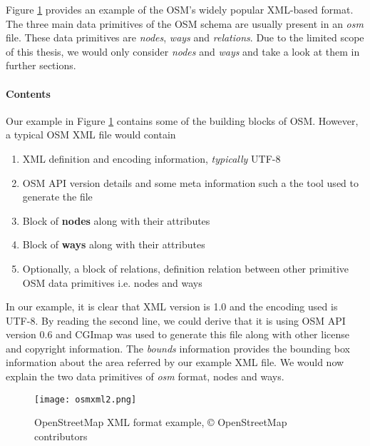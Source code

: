 Figure \ref{fg:osmxml} provides an example of the OSM's widely popular XML-based format. The three main data primitives of the OSM schema are usually present in an \textit{osm} file. These data primitives are \textit{nodes}, \textit{ways} and \textit{relations}. Due to the limited scope of this thesis, we would only consider \textit{nodes} and \textit{ways} and take a look at them in further sections.

\paragraph{Contents}
Our example in Figure \ref{fg:osmxml} contains some of the building blocks of OSM. However, a typical OSM XML file would contain
\begin{enumerate}
\item{XML definition and encoding information, \textit{typically} UTF-8}
\item{OSM API version details and some meta information such a the tool used to generate the file}
\item{Block of \textbf{nodes} along with their attributes}
\item{Block of \textbf{ways} along with their attributes}
\item{Optionally, a block of relations, definition relation between other primitive OSM data primitives i.e. nodes and ways}
\end{enumerate}

In our example, it is clear that XML version is 1.0 and the encoding used is UTF-8. By reading the second line, we could derive that it is using OSM API version 0.6 and CGImap was used to generate this file along with other license and copyright information. The \textit{bounds} information provides the bounding box information about the area referred by our example XML file. We would now explain the two data primitives of \textit{osm} format, nodes and ways.


\begin{figure}
\texttt{[image: osmxml2.png]}
\caption{OpenStreetMap XML format example, {\copyright} OpenStreetMap contributors }
\label{fg:osmxml}
\end{figure}

